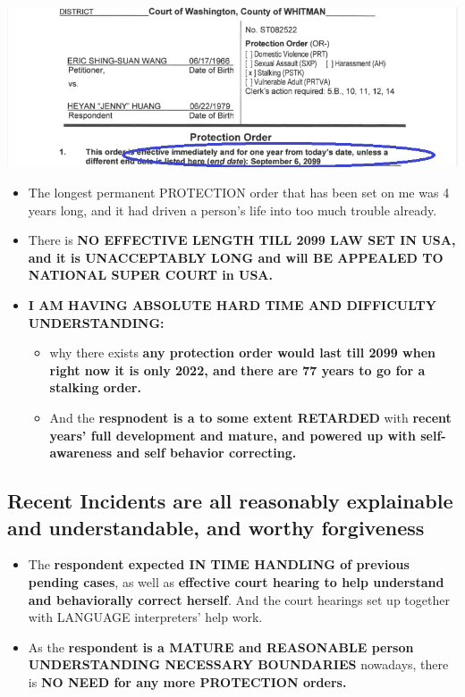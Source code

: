 \documentclass[9pt, b5paper]{article}
\begin{document}
\includegraphics[width=.9\linewidth]{./pic/dearCousin_20220919_222725.png}
\begin{itemize}
\item The longest permanent PROTECTION order that has been set on me was 4 years long, and it had driven a person's life into too much trouble already.
\item There is \textbf{NO EFFECTIVE LENGTH TILL 2099 LAW SET IN USA, and it is UNACCEPTABLY LONG and will BE APPEALED TO NATIONAL SUPER COURT in USA.}
\item \textbf{I AM HAVING ABSOLUTE HARD TIME AND DIFFICULTY UNDERSTANDING:}
\begin{itemize}
\item why there exists \textbf{any protection order would last till 2099 when right now it is only 2022, and there are 77 years to go for a stalking order.}
\item And the \textbf{respnodent is a to some extent RETARDED} with \textbf{recent years' full development and mature, and powered up with self-awareness and self behavior correcting.}
\end{itemize}
\end{itemize}
\subsection{Recent Incidents are all reasonably explainable and understandable, and worthy forgiveness}
\label{sec-1-2}
\begin{itemize}
\item The \textbf{respondent expected IN TIME HANDLING of previous pending cases}, as well as \textbf{effective court hearing to help understand and behaviorally correct herself}. And the court hearings set up together with LANGUAGE interpreters' help work.
\item As the \textbf{respondent is a MATURE and REASONABLE person UNDERSTANDING NECESSARY BOUNDARIES} nowadays, there is \textbf{NO NEED for any more PROTECTION orders.}
\end{itemize}
\end{document}
